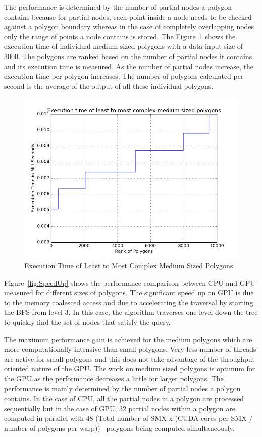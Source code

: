 The performance is determined by the number of partial nodes a polygon contains because for partial nodes, each point inside a node needs to be checked against a polygon boundary whereas in the case of completely overlapping nodes only the range of points a node contains is stored.
The Figure~\ref{fig:LToMCmplxMedP} shows the execution time of individual medium sized polygons with a data input size of 3000. The polygons are ranked based on the number of partial nodes it contains and its execution time is measured. As the number of partial nodes increase, the execution time per polygon increases.
The number of polygons calculated per second is the average of the output of all these individual polygons.

\begin{figure}[H]
\centering
\vspace{0.5in}
\includegraphics[scale=0.5]{Images/LToMCmplxMedP}
\vspace{0.5in}
\caption{Execution Time of Least to Most Complex Medium Sized Polygons.}
\label{fig:LToMCmplxMedP}
\end{figure}

Figure~\ref{fig:SpeedUp} shows the performance comparison between CPU and GPU measured for different sizes of polygons. The significant speed up on GPU is due to the memory coalesced access and due to accelerating the traversal by starting the BFS from level 3. In this case, the algorithm traverses one level down the tree to quickly find the set of nodes that satisfy the query, 

The maximum performance gain is achieved for the medium polygons which are more computationally intensive than small polygons. Very less number of threads are active for small polygons and this does not take advantage of the throughput oriented nature of the GPU. The work on medium sized polygons is optimum for the GPU as the performance decreases a little for larger polygons. The performance is mainly determined by the number of partial nodes a polygon contains. In the case of CPU, all the partial nodes in a polygon are processed sequentially but in the case of GPU, 32 partial nodes within a polygon are computed in parallel with 48 (Total number of SMX x (CUDA cores per SMX / number of polygons per warp))~\cite{nvidia:12:gtx680tech} polygons being computed simultaneously.

